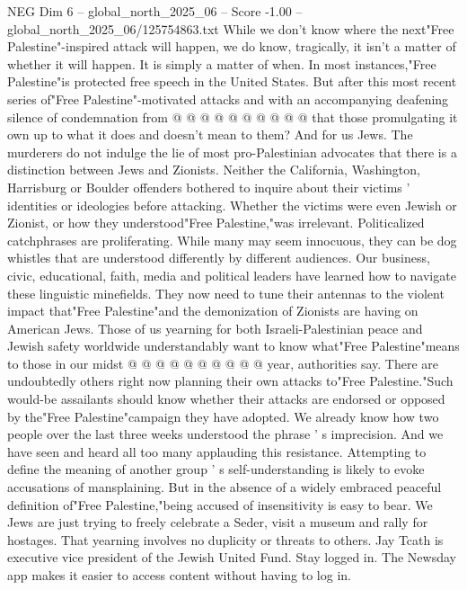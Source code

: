 \begin{textsample}{NEG Dim 6 – global\_north\_2025\_06 – Score -1.00 – global\_north\_2025\_06/125754863.txt}
While we don't know where the next"Free Palestine"-inspired attack will happen, we do know, tragically, it isn't a matter of whether it will happen.
It is simply a matter of when.
In most instances,"Free Palestine"is protected free speech in the United States.
But after this most recent series of"Free Palestine"-motivated attacks and with an accompanying deafening silence of condemnation from @ @ @ @ @ @ @ @ @ @ that those promulgating it own up to what it does and doesn't mean to them?
And for us Jews.
The murderers do not indulge the lie of most pro-Palestinian advocates that there is a distinction between Jews and Zionists.
Neither the California, Washington, Harrisburg or Boulder offenders bothered to inquire about their victims ' identities or ideologies before attacking.
Whether the victims were even Jewish or Zionist, or how they understood"Free Palestine,"was irrelevant.
Politicalized catchphrases are proliferating.
While many may seem innocuous, they can be dog whistles that are understood differently by different audiences.
Our business, civic, educational, faith, media and political leaders have learned how to navigate these linguistic minefields.
They now need to tune their antennas to the violent impact that"Free Palestine"and the demonization of Zionists are having on American Jews.
Those of us yearning for both Israeli-Palestinian peace and Jewish safety worldwide understandably want to know what"Free Palestine"means to those in our midst @ @ @ @ @ @ @ @ @ @ year, authorities say.
There are undoubtedly others right now planning their own attacks to"Free Palestine."Such would-be assailants should know whether their attacks are endorsed or opposed by the"Free Palestine"campaign they have adopted.
We already know how two people over the last three weeks understood the phrase ' s imprecision.
And we have seen and heard all too many applauding this resistance.
Attempting to define the meaning of another group ' s self-understanding is likely to evoke accusations of mansplaining.
But in the absence of a widely embraced peaceful definition of"Free Palestine,"being accused of insensitivity is easy to bear.
We Jews are just trying to freely celebrate a Seder, visit a museum and rally for hostages.
That yearning involves no duplicity or threats to others.
Jay Tcath is executive vice president of the Jewish United Fund.
Stay logged in.
The Newsday app makes it easier to access content without having to log in.

\end{textsample}
